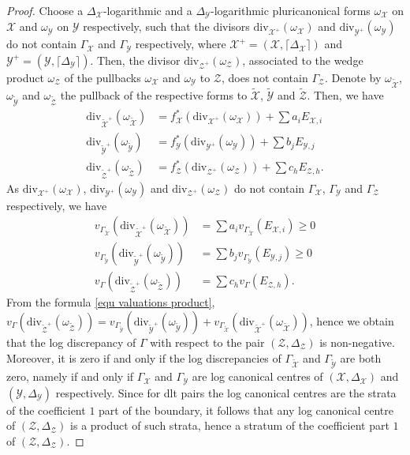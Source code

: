 \documentclass{amsart}%
\numberwithin{equation}{subsection}
\theoremstyle{plain2}
\theoremstyle{definition2}
\theoremstyle{stepstyle}
\theoremstyle{point}
\theoremstyle{subpoint}
\newcommand{\cX}{\ensuremath{\mathscr{X}}}
\newcommand{\cY}{\ensuremath{\mathscr{Y}}}
\newcommand{\cZ}{\ensuremath{\mathscr{Z}}}
\renewcommand{\cY}{\ensuremath{\mathscr{Y}}}
\newcommand{\divisor}{\mathrm{div}}
\begin{document}
\begin{proof}
Choose a $\Delta_{\cX}$-logarithmic and a $\Delta_{\cY}$-logarithmic pluricanonical forms $\omega_{\cX}$ on $\cX$ and  $\omega_{\cY}$ on $\cY$ respectively, such that the divisors $\divisor_{\cX^+}(\omega_\cX)$ and $\divisor_{\cY^+}(\omega_{\cY})$ do not contain $\Gamma_\cX$ and $\Gamma_\cY$ respectively, where $\cX^+=(\cX,\lceil \Delta_{\cX}\rceil)$ and  $\cY^+=(\cY,\lceil \Delta_{\cY}\rceil)$. Then, the divisor $\divisor_{\cZ^+}(\omega_{\cZ})$, associated to the wedge product $\omega_{\cZ}$ of the pullbacks $\omega_{\cX}$ and $\omega_{\cY}$ to $\cZ$, does not contain $\Gamma_{\cZ}$.  Denote by $\omega_{\widetilde{\cX}}$, $\omega_{\widetilde{\cY}}$ and $\omega_{\widetilde{\cZ}}$ the pullback of the respective forms to $\widetilde{\cX}$, $\widetilde{\cY}$ and $\widetilde{\cZ}$. Then, we have 
\begin{align*}
\divisor_{\widetilde{\cX}^+} (\omega_{\widetilde{\cX}})&  = f_\cX^*(\divisor_{\cX^+}(\omega_\cX)) + \sum a_i E_{\cX,i} \\
\divisor_{\widetilde{\cY}^+} (\omega_{\widetilde{\cY}})&  = f_\cY^*(\divisor_{\cY^+}(\omega_\cY)) +  \sum b_j E_{\cY,j}\\
\divisor_{\widetilde{\cZ}^+} (\omega_{\widetilde{\cZ}})&  = f_\cZ^*(\divisor_{\cZ^+}(\omega_\cZ)) +  \sum c_h E_{\cZ,h}.
\end{align*} As $\divisor_{\cX^+}(\omega_\cX)$, $\divisor_{\cY^+}(\omega_{\cY})$ and $\divisor_{\cZ^+}(\omega_{\cZ})$ do not contain $\Gamma_\cX$, $\Gamma_\cY$ and $\Gamma_{\cZ}$ respectively, we have
\begin{align*}
v_{\Gamma_{\widetilde{\cX}}}(\divisor_{\widetilde{\cX}^+} (\omega_{\widetilde{\cX}}))&  = \sum a_i v_{\Gamma_{\widetilde{\cX}}}(E_{\cX,i}) \geqslant 0 \\
v_{\Gamma_{\widetilde{\cY}}}(\divisor_{\widetilde{\cY}^+} (\omega_{\widetilde{\cY}}))&  = \sum b_j v_{\Gamma_{\widetilde{\cY}}}(E_{\cY,j}) \geqslant 0\\
v_{\Gamma}(\divisor_{\widetilde{\cZ}^+} (\omega_{\widetilde{\cZ}}))&  = \sum c_h v_{\Gamma}( E_{\cZ,h}).
\end{align*}
From the formula \ref{equ valuations product},  $v_{\Gamma}(\divisor_{\widetilde{\cZ}^+} (\omega_{\widetilde{\cZ}}))= v_{\Gamma_{\widetilde{\cY}}}(\divisor_{\widetilde{\cY}^+} (\omega_{\widetilde{\cY}}))+ v_{\Gamma_{\widetilde{\cX}}}(\divisor_{\widetilde{\cX}^+} (\omega_{\widetilde{\cX}}))$, hence we obtain that the log discrepancy of $\Gamma$ with respect to the pair $(\cZ,\Delta_{\cZ})$ is non-negative. Moreover, it is zero if and only if the log discrepancies of $\Gamma_{\widetilde{\cX}}$ and $\Gamma_{\widetilde{\cY}}$ are both zero, namely if and only if $\Gamma_\cX$ and $\Gamma_{\cY}$ are log canonical centres of $(\cX,\Delta_{\cX})$ and $(\cY,\Delta_{\cY})$ respectively. Since for dlt pairs the log canonical centres are the strata of the coefficient $1$ part of the boundary, it follows that any log canonical centre of $(\cZ,\Delta_{\cZ})$ is a product of such strata, hence a stratum of the coefficient part $1$ of $(\cZ,\Delta_{\cZ})$.
\end{proof}
\end{document}
